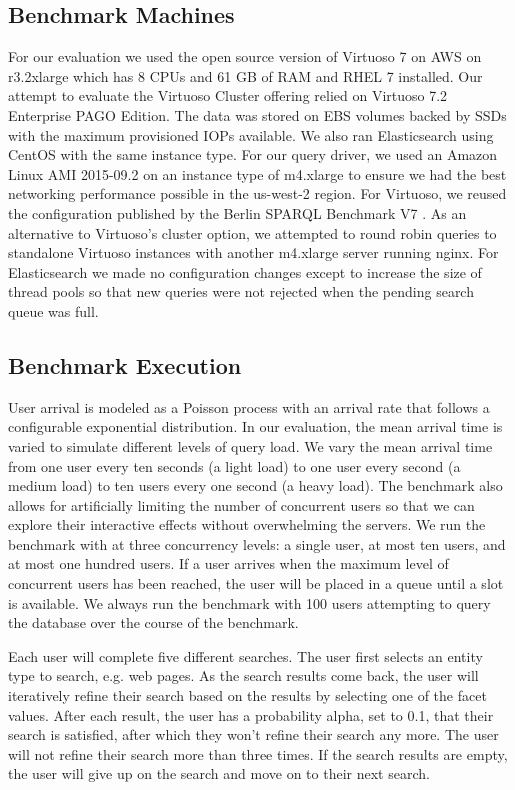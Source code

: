 \subsection{Benchmark Machines}
For our evaluation we used the open source version of Virtuoso 7 on AWS on r3.2xlarge which has 8 CPUs and 61 GB of RAM and RHEL 7 installed.  
Our attempt to evaluate the Virtuoso Cluster offering relied on Virtuoso 7.2 Enterprise PAGO Edition.
The data was stored on EBS volumes backed by SSDs with the maximum provisioned IOPs available. 
We also ran Elasticsearch using CentOS with the same instance type.  
For our query driver, we used an Amazon Linux AMI 2015-09.2 on an instance type of m4.xlarge to ensure we had the best networking performance possible in the us-west-2 region.    
For Virtuoso, we reused the configuration published by the Berlin SPARQL Benchmark V7 \cite{bsbmv7}.
As an alternative to Virtuoso's cluster option, we attempted to round robin queries to standalone Virtuoso instances with another m4.xlarge server running nginx.
For Elasticsearch we made no configuration changes except to increase the size of thread pools so that new queries were not rejected when the pending search queue was full. 

\subsection{Benchmark Execution}
User arrival is modeled as a Poisson process with an arrival rate that follows a configurable exponential distribution.  
In our evaluation, the mean arrival time is varied to simulate different levels of query load.  
We vary the mean arrival time from one user every ten seconds (a light load) to one user every second (a medium load) to ten users every one second (a heavy load).
The benchmark also allows for artificially limiting the number of concurrent users so that we can explore their interactive effects without overwhelming the servers.  
We run the benchmark with at three concurrency levels: a single user, at most ten users, and at most one hundred users.
If a user arrives when the maximum level of concurrent users has been reached, the user will be placed in a queue until a slot is available.  
We always run the benchmark with 100 users attempting to query the database over the course of the benchmark.

Each user will complete five different searches. 
The user first selects an entity type to search, e.g. web pages.
As the search results come back, the user will iteratively refine their search based on the results by selecting one of the facet values.
After each result, the user has a probability alpha, set to 0.1, that their search is satisfied, after which they won't refine their search any more.
The user will not refine their search more than three times.
If the search results are empty, the user will give up on the search and move on to their next search.

